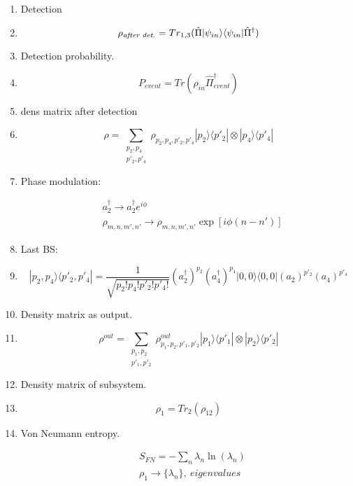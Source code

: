 \documentclass[12pt]{article}
\begin{document}
\begin{enumerate}
\item Detection

\item $$  \rho_{\text{\textit{after det.}}} =  Tr_{1,3}(\hat{\Pi} |\psi_{in}\rangle \langle \psi_{in}|   \hat{\Pi}^{\dag}) $$

\item Detection probability.

\item $$  P_{event} =  Tr(  \rho_{in}  \hat{\Pi}^{\dag}_{event}) $$


\item dens matrix after detection

\item $$ \rho = \sum_{\substack{p_{2},p_{4} \\ p'_{2}, p'_{4}}}  \rho_{p_{2},p_{4}, p'_{2}, p'_{4}} |p_{2}\rangle \langle p'_{2}| \otimes |p_{4}\rangle \langle p'_{4}| $$

\item Phase modulation:

\begin{align*} 
&  a_{2}^{\dag} \rightarrow   a_{2}^{\dag} e^{i\phi} \\
& \rho_{m,n,m',n'} \rightarrow \rho_{m,n,m',n'} \exp[i \phi (n - n')]
\end{align*}

\item Last BS:

\item $$   |p_{2},p_{4}\rangle \langle p'_{2},p'_{4}| = \frac{1}{\sqrt{p_{2}!p_{4}!p'_{2}!p'_{4}!}} (a_{2}^{\dag})^{p_{2}} (a_{4}^{\dag})^{p_{4}} |0,0\rangle \langle 0,0| (a_{2})^{p'_{2}} (a_{4})^{p'_{4}}
 $$


\item Density matrix as output.

\item $$ \rho^{out} = \sum_{\substack{p_{1},p_{2} \\ p'_{1}, p'_{2}}}  \rho^{out}_{p_{1},p_{2}, p'_{1}, p'_{2}} |p_{1}\rangle \langle p'_{1}| \otimes |p_{2}\rangle \langle p'_{2}| $$

\item Density matrix of subsystem.

\item $$ \rho_{1} = Tr_{2}(\rho_{12}) $$

\item Von Neumann entropy.

\begin{align*}
& S_{FN} = - \sum_{n} \lambda_{n} \ln(\lambda_{n})  \\
& \rho_{1}   \rightarrow  \{ \lambda_{n} \}, \ eigenvalues 
\end{align*}


\end{enumerate}
\end{document}
